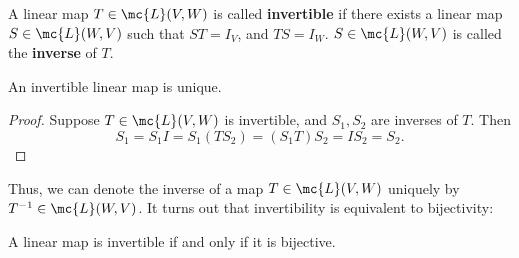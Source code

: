 \documentclass[math0540-lecture-notes.tex]{subfiles}
\begin{document}
\begin{definition}{}
  A linear map $T\in \mc{L}(V,W)$ is called \textbf{invertible} if there exists a linear map $S\in
  \mc{L}(W,V)$ such that $ST=I_V$, and $TS=I_W$. $S\in \mc{L}(W,V)$ is called the \textbf{inverse}
  of $T$.
\end{definition}

\begin{proposition}{}
  An invertible linear map is unique.
\end{proposition}
\begin{proof}[Proof]
  Suppose $T\in \mc{L}(V,W)$ is invertible, and $S_1,S_2$ are inverses of $T$. Then \[
    S_1=S_1I=S_1(TS_2)=(S_1T)S_2=IS_2=S_2
  .\] 
\end{proof}

Thus, we can denote the inverse of a map $T\in \mc{L}(V,W)$ uniquely by $T^{-1}\in \mc{L}(W,V)$. It
turns out that invertibility is equivalent to bijectivity:
\begin{proposition}[]{}
  A linear map is invertible if and only if it is bijective.
\end{proposition}
\end{document}
